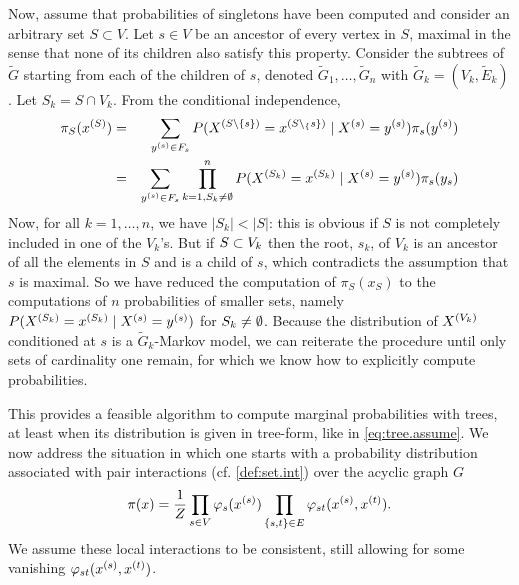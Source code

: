 Now, assume that probabilities of singletons have been computed and consider an arbitrary set $S \subset V$. Let $s\in V$ be  an ancestor of every vertex in $S$, maximal in the sense that none of its children also satisfy this property. Consider the subtrees
of $\tilde G$ starting from each of the children of $s$, denoted
$\tilde G_1,
\ldots, \tilde G_n$ with $\tilde G_k = (V_k, \tilde E_k)$. Let $S_k = S\cap V_k$. From the
conditional independence,
\begin{eqnarray*}
\pi_S(x^{(S)}) &=& \sum_{y^{(s)}\in F_s} P(X^{(S\setminus \{s\})} =
x^{(S\setminus_\{s\})}\mid X^{(s)} = y^{(s)}) \pi_s(y^{(s)})\\
&=& \sum_{y^{(s)}\in F_s} \prod_{k=1, S_k\neq \emptyset}^n P(X^{(S_k)}=x^{(S_k)}\mid X^{(s)} = y^{(s)})
\pi_s(y_s)
\end{eqnarray*}
Now, for all $k=1, \ldots, n$, we have $|S_k| < |S|$: this is obvious
if $S$ is not completely included in one of the $V_k$'s. But if $S\subset
V_k$ then the root, $s_k$, of $V_k$ is an ancestor of all the elements
in $S$ and is a child of $s$, which contradicts the assumption that
$s$ is maximal. So we have reduced the computation of $\pi_S(x_S)$ to
the computations of $n$ probabilities of smaller sets, namely
$P(X^{(S_k)}= x^{(S_k)}\mid X^{(s)} = y^{(s)})$ for $S_k\neq \emptyset$. Because the
distribution of $X^{(V_k)}$ conditioned at $s$ is a $\tilde G_k$-Markov model, we
can reiterate the procedure until only sets of cardinality one remain,
for which we know how to explicitly compute probabilities.

\bigskip
This provides a  feasible algorithm to compute
marginal probabilities with trees, at least when its distribution is given 
in tree-form, like in \cref{eq:tree.assume}. We now address the situation in which one starts with  a probability distribution associated with pair interactions (cf. 
\cref{def:set.int}) over the acyclic graph $G$
\begin{equation}
\label{eq:pi.tree}
\pi(x) = \frac{1}{Z} \prod_{s\in V} \varphi_s(x^{(s)}) \prod_{\left\{ s,t \right\}\in E} \varphi_{st}(x^{(s)}, x^{(t)}).
\end{equation}
We assume these local interactions to be consistent, still
allowing for some vanishing $\varphi_{st}(x^{(s)}, x^{(t)})$.


